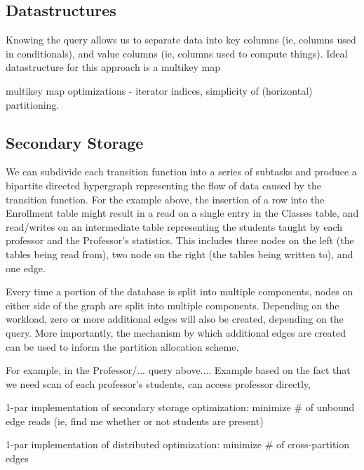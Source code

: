 \subsection{Datastructures}
Knowing the query allows us to separate data into key columns (ie, columns used in conditionals), and value columns (ie, columns used to compute things).  Ideal datastructure for this approach is a multikey map

multikey map optimizations - iterator indices, simplicity of (horizontal) partitioning.

\subsection{Secondary Storage}
We can subdivide each transition function into a series of subtasks and produce a bipartite directed hypergraph representing the flow of data caused by the transition function.  For the example above, the insertion of a row into the Enrollment table might result in a read on a single entry in the Classes table, and read/writes on an intermediate table representing the students taught by each professor and the Professor's statistics.  This includes three nodes on the left (the tables being read from), two node on the right (the tables being written to), and one edge.

Every time a portion of the database is split into multiple components, nodes on either side of the graph are split into multiple components.  Depending on the workload, zero or more additional edges will also be created, depending on the query.  More importantly, the mechanism by which additional edges are created can be used to inform the partition allocation scheme.  

For example, in the Professor/... query above....  Example based on the fact that we need scan of each professor's students, can access professor directly, 

1-par implementation of secondary storage optimization: minimize # of unbound edge reads (ie, find me whether or not students are present)

1-par implementation of distributed optimization: minimize # of cross-partition edges

